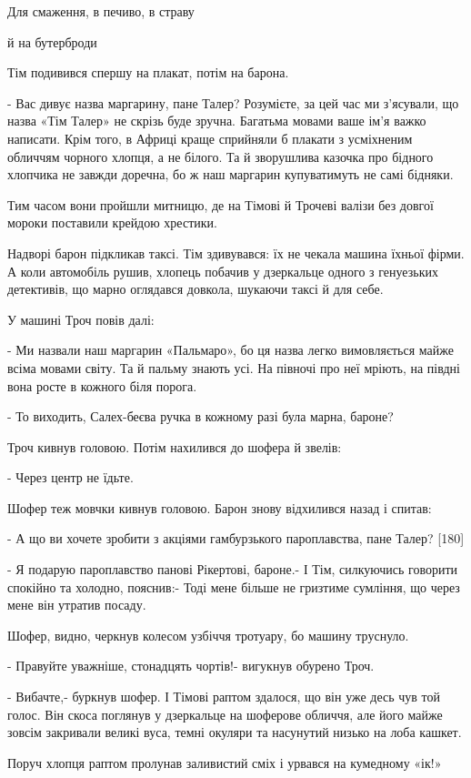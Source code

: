 Для смаження, в печиво, в страву

й на бутерброди

Тім подивився спершу на плакат, потім на барона.

- Вас дивує назва маргарину, пане Талер? Розумієте, за цей час ми з'ясували, що назва «Тім Талер» не скрізь буде зручна. Багатьма мовами ваше ім'я важко написати. Крім того, в Африці краще сприйняли б плакати з усміхненим обличчям чорного хлопця, а не білого. Та й зворушлива казочка про бідного хлопчика не завжди доречна, бо ж наш маргарин купуватимуть не самі бідняки.

Тим часом вони пройшли митницю, де на Тімові й Трочеві валізи без довгої мороки поставили крейдою хрестики.

Надворі барон підкликав таксі. Тім здивувався: їх не чекала машина їхньої фірми. А коли автомобіль рушив, хлопець побачив у дзеркальце одного з генуезьких детективів, що марно оглядався довкола, шукаючи таксі й для себе.

У машині Троч повів далі:

- Ми назвали наш маргарин «Пальмаро», бо ця назва легко вимовляється майже всіма мовами світу. Та й пальму знають усі. На півночі про неї мріють, на півдні вона росте в кожного біля порога.

- То виходить, Салех-беєва ручка в кожному разі була марна, бароне?

Троч кивнув головою. Потім нахилився до шофера й звелів:

- Через центр не їдьте.

Шофер теж мовчки кивнув головою. Барон знову відхилився назад і спитав:

- А що ви хочете зробити з акціями гамбурзького пароплавства, пане Талер? [180]

- Я подарую пароплавство панові Рікертові, бароне.- І Тім, силкуючись говорити спокійно та холодно, пояснив:- Тоді мене більше не гризтиме сумління, що через мене він утратив посаду.

Шофер, видно, черкнув колесом узбіччя тротуару, бо машину труснуло.

- Правуйте уважніше, стонадцять чортів!- вигукнув обурено Троч.

- Вибачте,- буркнув шофер. І Тімові раптом здалося, що він уже десь чув той голос. Він скоса поглянув у дзеркальце на шоферове обличчя, але його майже зовсім закривали великі вуса, темні окуляри та насунутий низько на лоба кашкет.

Поруч хлопця раптом пролунав заливистий сміх і урвався на кумедному «ік!»

